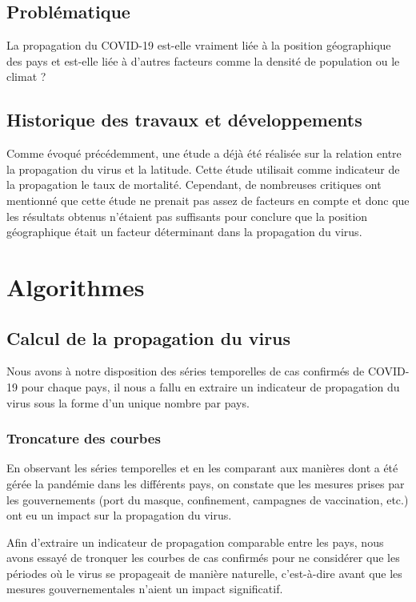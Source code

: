 \documentclass[12pt]{iEEEtran}
\begin{document}
\subsection{Problématique}
La propagation du COVID-19 est-elle vraiment liée à la position géographique des pays
et est-elle liée à d'autres facteurs comme la densité de population ou le climat ?

\subsection{Historique des travaux et développements}
Comme évoqué précédemment, une étude \cite{kaggle} a déjà été réalisée sur la relation entre
la propagation du virus et la latitude. Cette étude utilisait comme indicateur de la propagation
le taux de mortalité. Cependant, de nombreuses critiques ont mentionné que cette étude ne prenait
pas assez de facteurs en compte et donc que les résultats obtenus n'étaient pas suffisants pour
conclure que la position géographique était un facteur déterminant dans la propagation du virus.

\section{Algorithmes}
\subsection{Calcul de la propagation du virus}

Nous avons à notre disposition des séries temporelles de cas confirmés de COVID-19 pour chaque
pays, il nous a fallu en extraire un indicateur de propagation du virus sous la forme d'un
unique nombre par pays.

\subsubsection{Troncature des courbes}
En observant les séries temporelles et en les comparant aux manières dont a été gérée la pandémie
dans les différents pays, on constate que les mesures prises par les gouvernements (port du masque,
confinement, campagnes de vaccination, etc.) ont eu un impact sur la propagation du virus.

Afin d'extraire un indicateur de propagation comparable entre les pays, nous avons essayé de tronquer
les courbes de cas confirmés pour ne considérer que les périodes où le virus se propageait de manière
naturelle, c'est-à-dire avant que les mesures gouvernementales n'aient un impact significatif.
\end{document}
